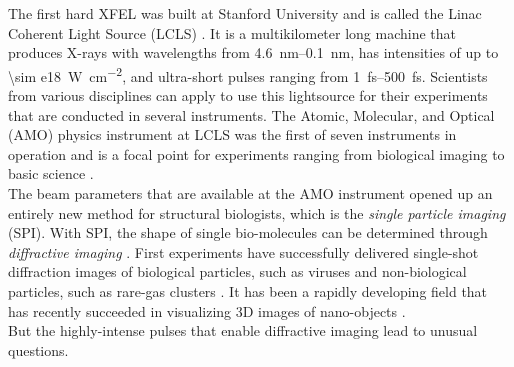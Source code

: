 %
The first hard XFEL was built at Stanford University and is called the Linac Coherent Light Source (LCLS) \citep{Emma-2010-NatPho}. It is a multikilometer long machine that produces X-rays with wavelengths from \SIrange{4.6}{0.1}{\nano\meter}, has intensities of up to \SI{\sim e18}{\watt\per\square\centi\meter}, and ultra-short pulses ranging from \SIrange{1}{500}{\femto\second}. Scientists from various disciplines can apply to use this lightsource for their experiments that are conducted in several instruments. The Atomic, Molecular, and Optical (AMO) physics instrument at LCLS was the first of seven instruments in operation and is a focal point for experiments ranging from biological imaging to basic science \citep{Bostedt-2016-RMP}.\\[1\baselineskip]
%
The beam parameters that are available at the AMO instrument opened up an entirely new method for structural biologists, which is the \textit{single particle imaging} (SPI). With SPI, the shape of single bio-molecules can be determined through \textit{diffractive imaging} \citep{Chapman-2006-NatPhys}. First experiments have successfully delivered single-shot diffraction images of biological particles, such as viruses \citep{Seibert-2011-Nature} and non-biological particles, such as rare-gas clusters \citep{Gomez-2014-Science}. It has been a rapidly developing field that has recently succeeded in visualizing 3D images of nano-objects \citep{Ekeberg-2015-PRL,Barke-2015-NatComm}.\\[1\baselineskip]
%
But the highly-intense pulses that enable diffractive imaging lead to unusual questions. 
%
